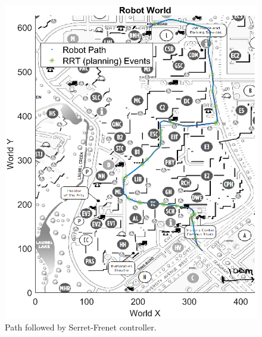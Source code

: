 \documentclass[oneside, 11pt]{book}
\begin{document}
\begin{figure}[!htbp]
    \centering
    \includegraphics{images/campus_serret_frenet.eps}
    \caption{Path followed by Serret-Frenet controller.}
    \label{fig:mock_campus_serret_frenet}
\end{figure}
\end{document}
